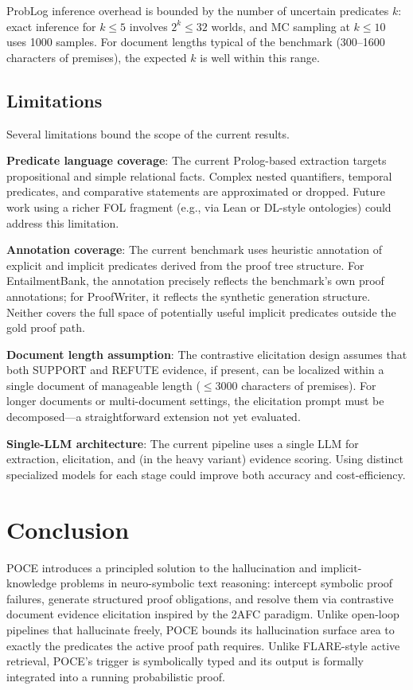 \documentclass[11pt,letterpaper]{article}
\begin{document}
ProbLog inference overhead is bounded by the number of uncertain predicates $k$: exact inference for $k \leq 5$ involves $2^k \leq 32$ worlds, and MC sampling at $k \leq 10$ uses 1000 samples. For document lengths typical of the benchmark (300--1600 characters of premises), the expected $k$ is well within this range.

\subsection{Limitations}

Several limitations bound the scope of the current results.

\textbf{Predicate language coverage}:
The current Prolog-based extraction targets propositional and simple relational facts. Complex nested quantifiers, temporal
predicates, and comparative statements are approximated or dropped. Future work using a richer FOL fragment (e.g., via
Lean \citep{Moura2021} or DL-style ontologies) could address this limitation.

\textbf{Annotation coverage}: The current benchmark uses
heuristic annotation of explicit and implicit predicates derived from the proof tree structure. For EntailmentBank, the
annotation precisely reflects the benchmark's own proof annotations; for ProofWriter, it reflects the synthetic generation
structure. Neither covers the full space of potentially useful implicit predicates outside the gold proof path.

\textbf{Document length assumption}: The contrastive elicitation design assumes that both SUPPORT and REFUTE evidence, if present, can
be localized within a single document of manageable length ($\leq 3000$ characters of premises). For longer documents
or multi-document settings, the elicitation prompt must be decomposed---a straightforward extension not yet evaluated.

\textbf{Single-LLM architecture}: The current pipeline uses a single LLM for extraction, elicitation, and (in the heavy variant)
evidence scoring. Using distinct specialized models for each stage could improve both accuracy and cost-efficiency.

\section{Conclusion}

POCE introduces a principled solution to the hallucination and implicit-knowledge problems in neuro-symbolic
text reasoning: intercept symbolic proof failures, generate structured proof obligations, and resolve them via contrastive
document evidence elicitation inspired by the 2AFC paradigm. Unlike open-loop pipelines that hallucinate freely, POCE
bounds its hallucination surface area to exactly the predicates the active proof path requires. Unlike FLARE-style active
retrieval, POCE's trigger is symbolically typed and its output is formally integrated into a running probabilistic proof.
\end{document}
